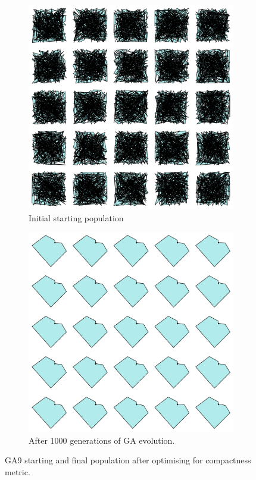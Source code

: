 \documentclass{article}
\begin{document}
\begin{figure}[H]
    \centering
    \begin{subfigure}[b]{0.45\textwidth}
        \centering
        \includegraphics[width=\textwidth]{figures/GAResults/GA9/300point_initial_pop.png}
        \caption{Initial starting population}
        \label{fig:GA9_starting}
    \end{subfigure}
    \hfill
    \begin{subfigure}[b]{0.45\textwidth}
        \centering
        \includegraphics[width=\textwidth]{figures/GAResults/GA9/1000gens_10pars_100initpop_5pcent_mut.png}
        \caption{After 1000 generations of GA evolution.}
        \label{fig:GA9_final}
    \end{subfigure}
    \caption{GA9 starting and final population after optimising for compactness metric.}
    \label{fig:GA9_before_after_GA}
\end{figure}
\end{document}
